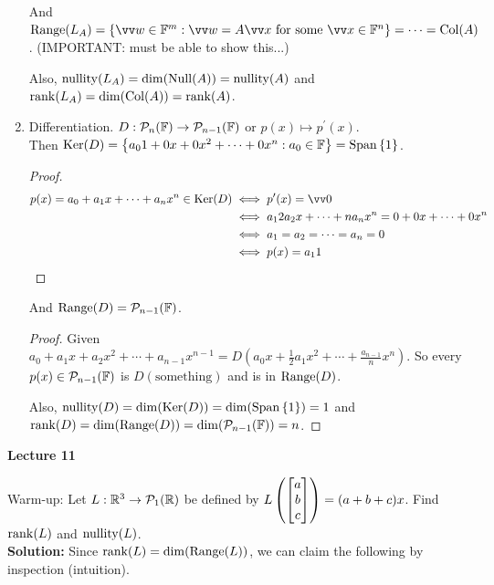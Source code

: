 \begin{example}
\begin{enumerate}
        And $\range(L_A) = \left\{ \vw \in \F^m: \vw = A\vx \text{ for some } \vx \in \F^n \right\} = \cdots = \col(A)$. (IMPORTANT: must be able to show this...)

        Also, $\operatorname{nullity}(L_A) = \dim(\operatorname{Null}(A)) = \operatorname{nullity}(A)$ and $\operatorname{rank}(L_A) = \dim(\operatorname{Col}(A)) = \operatorname{rank}(A)$.
        \item Differentiation. $D:\mathcal{P}_n({\mathbb{F}}) \to \mathcal{P}_{n-1}({\mathbb{F}})$ or $p(x) \mapsto p^\prime(x)$.\\
        Then $\operatorname{Ker}(D) = \left\{ a_01+0x+0x^2+\cdots +0x^n: a_0 \in {\mathbb{F}} \right\} = \operatorname{Span}{\{1\}}$.
        \begin{proof}
            \begin{align*}
                p(x) = a_0+a_1x+\cdots +a_nx^n \in \ker(D) &\iff p^\prime(x) = \vzero \\
                &\iff a_12a_2x+\cdots +na_nx^n = 0+0x+\cdots +0x^n \\
                &\iff a_1 = a_2 = \cdots = a_n = 0 \\
                &\iff p(x) = a_11
            \end{align*}
        \end{proof}

        And $\operatorname{Range}(D) = \mathcal{P}_{n-1}({\mathbb{F}})$. 
        \begin{proof}
            Given $a_0+a_1x+a_2x^2 + \cdots +a_{n-1}x^{n-1} = D(a_0x + \frac{1}{2}a_1x^2 + \cdots + \frac{a_{n-1}}{n}x^n)$.
            So every $p(x) \in \mathcal{P}_{n-1}({\mathbb{F}})$ is $D(\text{something})$ and is in $\operatorname{Range}(D)$.

            Also, $\operatorname{nullity}(D) = \dim(\operatorname{Ker}(D)) = \dim(\operatorname{Span}{\{1\}}) = 1$ and $\operatorname{rank}(D) = \dim(\operatorname{Range}(D)) = \dim(\mathcal{P}_{n-1}({\mathbb{F}})) = n$.
        \end{proof}
    \end{enumerate}
\end{example}


\makebox[\linewidth]{\hrulefill}
{\large \textbf{Lecture 11}}

Warm-up: Let $L:{\mathbb{R}}^3 \to \mathcal{P}_1({\mathbb{R}})$ be defined by $L\left( \begin{bmatrix} a \\ b \\ c \end{bmatrix} \right) = (a+b+c)x$. Find $\operatorname{rank}(L)$ and $\operatorname{nullity}(L)$.  \\
\textbf{Solution:} Since $\operatorname{rank}(L) = \dim(\operatorname{Range}(L))$, we can claim the following by inspection (intuition). 

